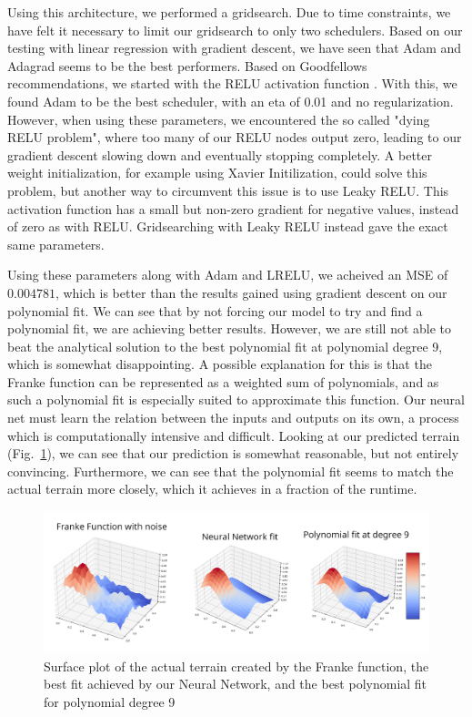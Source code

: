 \documentclass[onecolumn,10pt,cleanfoot]{asme2ej}
\begin{document}
Using this architecture, we performed a gridsearch. Due to time constraints, we have felt it necessary to limit our gridsearch to only two schedulers. Based on our testing with linear regression with gradient descent, we have seen that Adam and Adagrad seems to be the best performers. Based on Goodfellows recommendations, we started with the RELU activation function \cite[188]{gbc}. With this, we found Adam to be the best scheduler, with an eta of 0.01 and no regularization. However, when using these parameters, we encountered the so called "dying RELU problem", where too many of our RELU nodes output zero, leading to our gradient descent slowing down and eventually stopping completely. A better weight initialization, for example using Xavier Initilization, could solve this problem, but another way to circumvent this issue is to use Leaky RELU. This activation function has a small but non-zero gradient for negative values, instead of zero as with RELU. Gridsearching with Leaky RELU instead gave the exact same parameters.

Using these parameters along with Adam and LRELU, we acheived an MSE of $0.004781$, which is better than the results gained using gradient descent on our polynomial fit. We can see that by not forcing our model to try and find a polynomial fit, we are achieving better results. However, we are still not able to beat the analytical solution to the best polynomial fit at polynomial degree 9, which is somewhat disappointing. A possible explanation for this is that the Franke function can be represented as a weighted sum of polynomials, and as such a polynomial fit is especially suited to approximate this function. Our neural net must learn the relation between the inputs and outputs on its own, a process which is computationally intensive and difficult. Looking at our predicted terrain (Fig.~\ref{predterrain}), we can see that our prediction is somewhat reasonable, but not entirely convincing. Furthermore, we can see that the polynomial fit seems to match the actual terrain more closely, which it achieves in a fraction of the runtime.

\begin{figure}[H]
\centerline{\includegraphics[width=7in]{figure/Franke_fit_66x3_lam0.png}}
\caption{Surface plot of the actual terrain created by the Franke function, the best fit achieved by our Neural Network, and the best polynomial fit for polynomial degree 9}
\label{predterrain}
\end{figure}
\end{document}
